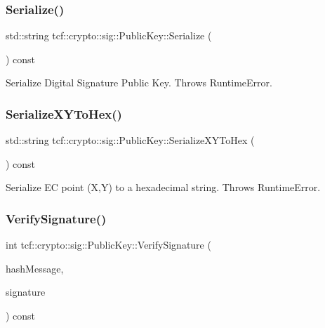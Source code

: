 \subsubsection{\texorpdfstring{Serialize()}{Serialize()}}
{\footnotesize\ttfamily std\+::string tcf\+::crypto\+::sig\+::\+Public\+Key\+::\+Serialize (\begin{DoxyParamCaption}{ }\end{DoxyParamCaption}) const}

Serialize Digital Signature Public Key. Throws Runtime\+Error. \mbox{\label{classtcf_1_1crypto_1_1sig_1_1PublicKey_a84fdc18e9b8975bd49a567b062b05125}} 
\subsubsection{\texorpdfstring{Serialize\+X\+Y\+To\+Hex()}{SerializeXYToHex()}}
{\footnotesize\ttfamily std\+::string tcf\+::crypto\+::sig\+::\+Public\+Key\+::\+Serialize\+X\+Y\+To\+Hex (\begin{DoxyParamCaption}{ }\end{DoxyParamCaption}) const}

Serialize EC point (X,Y) to a hexadecimal string. Throws Runtime\+Error. \mbox{\label{classtcf_1_1crypto_1_1sig_1_1PublicKey_a298e2971d1d237d45719fc9de64d57f0}} 
\subsubsection{\texorpdfstring{Verify\+Signature()}{VerifySignature()}}
{\footnotesize\ttfamily int tcf\+::crypto\+::sig\+::\+Public\+Key\+::\+Verify\+Signature (\begin{DoxyParamCaption}\item[{const \hyperlink{types_8h_a35da937e2331acce98d47f44892f4a76}{Byte\+Array} \&}]{hash\+Message,  }\item[{const \hyperlink{types_8h_a35da937e2331acce98d47f44892f4a76}{Byte\+Array} \&}]{signature }\end{DoxyParamCaption}) const}

